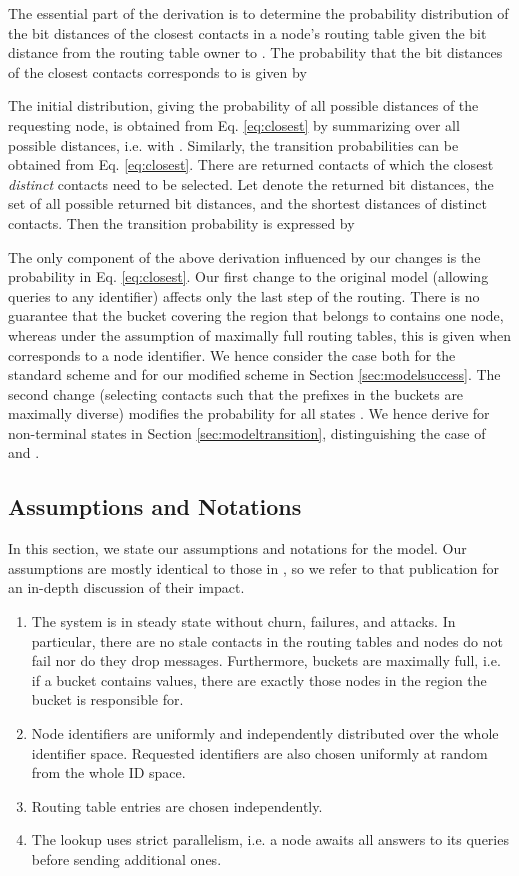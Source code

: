 \documentclass[10pt, conference, compsocconf, letterpaper]{IEEEtran}
\begin{document}
The essential part of the derivation is to determine the probability distribution
of the bit distances of the closest 
contacts in a node's routing table given the bit distance  from the routing table owner to .
The probability that the bit distances  of the closest contacts corresponds to  is given by

The initial distribution, giving the probability of all possible distances of the requesting node, is obtained from Eq. \ref{eq:closest} by summarizing over all possible distances, i.e.
 with .
Similarly, the transition probabilities can be obtained from Eq. \ref{eq:closest}.
There are  returned contacts of which the closest 
\emph{distinct} contacts need to be selected. Let  denote the
 returned bit distances, 
 the set of all possible returned bit distances, and 
  the shortest 
distances of distinct contacts.  
Then the transition probability is expressed by

 
The only component of the above derivation influenced by our changes is the probability  in Eq. \ref{eq:closest}. Our first change to the original model \cite{roos13comprehending} (allowing queries to any identifier) affects only the last step of the routing. There is no guarantee that the bucket covering the region that  belongs to contains one node, whereas under the assumption of maximally full routing tables, this is given when  corresponds to a node identifier. We hence consider the case  both for the standard scheme and for our modified scheme in Section \ref{sec:modelsuccess}.
The second change (selecting contacts such that the prefixes in the buckets are maximally diverse) modifies the probability  for all states . We hence derive  for non-terminal states  in Section \ref{sec:modeltransition}, distinguishing the case of  and .

\subsection{Assumptions and Notations}
In this section, we state our assumptions and notations for the model. Our assumptions are mostly identical to those in \cite{roos13comprehending}, so we refer to that
publication for an in-depth discussion of their impact.
\begin{enumerate}
\item The system is in steady state without churn, failures, and attacks. In particular, there are no stale contacts in the routing tables and nodes do not fail nor do they drop messages. Furthermore, buckets are maximally full, i.e. if a bucket contains  values, there are exactly those  nodes in the region the bucket is responsible for.
\item Node identifiers are uniformly and independently distributed over the whole identifier space. 
Requested identifiers are also chosen uniformly at random from the whole ID space. 
\item Routing table entries are chosen independently. 
\item The lookup uses strict parallelism, i.e. a node awaits all answers to its queries before 
sending additional ones.
\end{enumerate} 
\end{document}
